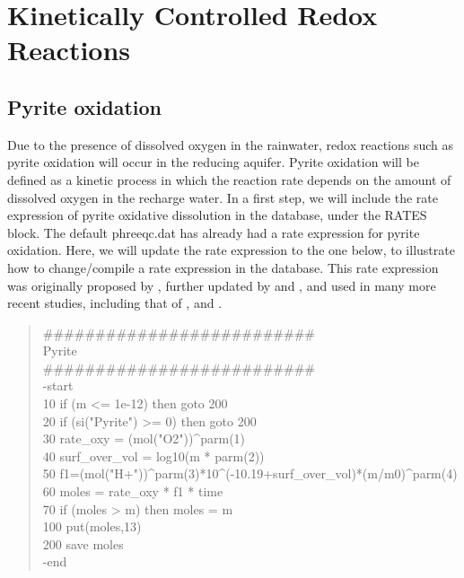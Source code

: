 \section[Kinetically Controlled Redox Reactions]{Kinetically Controlled Redox Reactions}

\subsection[Pyrite oxidation]{Pyrite oxidation}

Due to the presence of dissolved oxygen in the rainwater, redox reactions 
such as pyrite oxidation will occur in the reducing aquifer. 
Pyrite oxidation will be defined as a kinetic process in which the 
reaction rate depends on the amount of dissolved oxygen in the recharge water. 
In a first step, we will include the rate expression of 
pyrite oxidative dissolution in the database, under the RATES block. 
The default phreeqc.dat has already had a rate expression for pyrite oxidation. 
Here, we will update the rate expression to the one below, to illustrate 
how to change/compile a rate expression in the database. 
This rate expression was originally 
proposed by \cite{williamson94}, further updated by 
\cite{appelo98} and 
\cite{prommer_stuyfzand_2005}, 
and used in many more recent studies, including that of 
\cite{seibert2016}, \cite{ISI:000435539901626} and 
\cite{prommer2018}.

{\color{red}
\begin{quote}
\#\#\#\#\#\#\#\#\#\#\#\#\#\#\#\#\#\#\#\#\#\#\#\#\#\# \\
Pyrite \\
\#\#\#\#\#\#\#\#\#\#\#\#\#\#\#\#\#\#\#\#\#\#\#\#\#\# \\
-start \\
10 if (m <= 1e-12) then goto 200 \\
20 if (si("Pyrite") >= 0) then goto 200 \\
30 rate\_oxy = (mol("O2"))\^\hspace parm(1) \\
40 surf\_over\_vol = log10(m * parm(2)) \\
50 f1=(mol("H+"))\^\hspace{}parm(3)*10\^\hspace{}(-10.19+surf\_over\_vol)*(m/m0)\^\hspace{}parm(4)\\
60 moles = rate\_oxy * f1 * time \\
70 if (moles > m) then moles = m \\
100 put(moles,13) \\
200 save moles \\
-end \\
\end{quote}}


